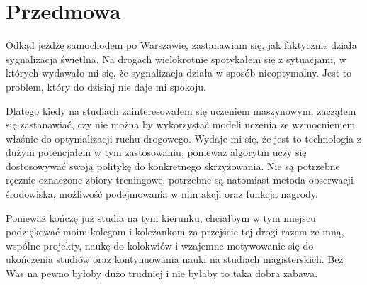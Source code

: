 \clearpage
\section*{Przedmowa}

Odkąd jeżdżę samochodem po Warszawie, zastanawiam się, jak faktycznie działa sygnalizacja świetlna. Na drogach wielokrotnie spotykałem się z sytuacjami, w których wydawało mi się, że sygnalizacja działa w sposób nieoptymalny. Jest to problem, który do dzisiaj nie daje mi spokoju.

Dlatego kiedy na studiach zainteresowałem się uczeniem maszynowym, zacząłem się zastanawiać, czy nie można by wykorzystać modeli uczenia ze wzmocnieniem właśnie do optymalizacji ruchu drogowego. Wydaje mi się, że jest to technologia z dużym potencjałem w tym zastosowaniu, ponieważ algorytm uczy się dostosowywać swoją politykę do konkretnego skrzyżowania. Nie są potrzebne ręcznie oznaczone zbiory treningowe, potrzebne są natomiast metoda obserwacji środowiska, możliwość podejmowania w nim akcji oraz funkcja nagrody.

Ponieważ kończę już studia na tym kierunku, chciałbym w tym miejscu podziękować moim kolegom i koleżankom za przejście tej drogi razem ze mną, wspólne projekty, naukę do kolokwiów i wzajemne motywowanie się do ukończenia studiów oraz kontynuowania nauki na studiach magisterskich. Bez Was na pewno byłoby dużo trudniej i nie byłaby to taka dobra zabawa.
